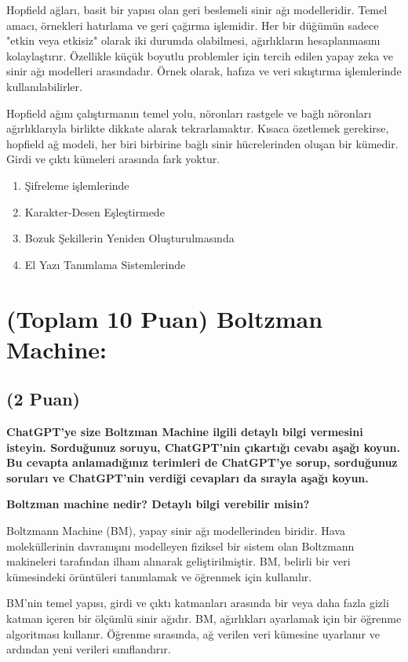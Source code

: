 \documentclass[11pt]{article}
\begin{document}
{Hopfield ağları, basit bir yapısı olan geri beslemeli sinir ağı modelleridir. Temel amacı, örnekleri hatırlama ve geri çağırma işlemidir. Her bir düğümün sadece "etkin veya etkisiz" olarak iki durumda olabilmesi, ağırlıkların hesaplanmasını kolaylaştırır. Özellikle küçük boyutlu problemler için tercih edilen yapay zeka ve sinir ağı modelleri arasındadır. Örnek olarak, hafıza ve veri sıkıştırma işlemlerinde kullanılabilirler. 

Hopfield ağını çalıştırmanın temel yolu, nöronları rastgele ve bağlı nöronları ağırlıklarıyla birlikte dikkate alarak tekrarlamaktır. Kısaca özetlemek gerekirse, hopfield ağ modeli, her biri birbirine bağlı sinir hücrelerinden oluşan bir kümedir. Girdi ve çıktı kümeleri arasında fark yoktur.

\begin{enumerate}
\item Şifreleme işlemlerinde
\item Karakter-Desen Eşleştirmede
\item Bozuk Şekillerin Yeniden Oluşturulmasında
\item El Yazı Tanımlama Sistemlerinde
\end{enumerate}

}

\section{(Toplam 10 Puan) Boltzman Machine:}

\subsection{(2 Puan)} \textbf{ChatGPT’ye size Boltzman Machine ilgili detaylı bilgi vermesini isteyin. Sorduğunuz soruyu, ChatGPT'nin çıkartığı cevabı aşağı koyun. Bu cevapta anlamadığınız terimleri de ChatGPT’ye sorup, sorduğunuz soruları ve ChatGPT’nin verdiği cevapları da sırayla aşağı koyun.}

\textbf{Boltzman machine nedir? Detaylı bilgi verebilir misin?}

Boltzmann Machine (BM), yapay sinir ağı modellerinden biridir. Hava moleküllerinin davranışını modelleyen fiziksel bir sistem olan Boltzmann makineleri tarafından ilham alınarak geliştirilmiştir. BM, belirli bir veri kümesindeki örüntüleri tanımlamak ve öğrenmek için kullanılır.

BM'nin temel yapısı, girdi ve çıktı katmanları arasında bir veya daha fazla gizli katman içeren bir ölçümlü sinir ağıdır. BM, ağırlıkları ayarlamak için bir öğrenme algoritması kullanır. Öğrenme sırasında, ağ verilen veri kümesine uyarlanır ve ardından yeni verileri sınıflandırır.
\end{document}
